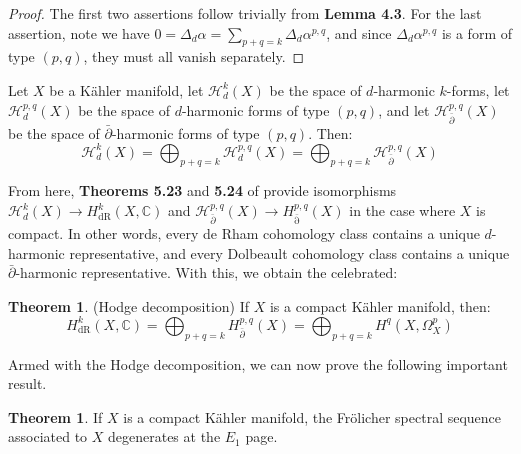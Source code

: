 \documentclass[11pt]{article}
\newcommand{\C}{\mathbb{C}}
\theoremstyle{definition}
\newtheorem{theorem}[equation]{Theorem}
\numberwithin{theorem}{section} %
\numberwithin{equation}{section} %
\begin{document}
\begin{proof}
    The first two assertions follow trivially from \textbf{Lemma 4.3}. For the last assertion, note we have $0 = \Delta_d\alpha = \sum_{p+q=k}\Delta_d\alpha^{p,q}$, and since $\Delta_d\alpha^{p,q}$ is a form of type $(p,q)$, they must all vanish separately.
\end{proof}

\begin{corollary}
    Let $X$ be a K\"ahler manifold, let $\mathcal{H}^k_d(X)$ be the space of $d$-harmonic $k$-forms, let $\mathcal{H}^{p,q}_d(X)$ be the space of $d$-harmonic forms of type $(p,q)$, and let $\mathcal{H}^{p,q}_{\bar\partial}(X)$ be the space of $\bar\partial$-harmonic forms of type $(p,q)$. Then:
    $$
    \mathcal{H}^{k}_d(X) = \bigoplus_{p+q=k}\mathcal{H}^{p,q}_{d}(X)=\bigoplus_{p+q=k}\mathcal{H}^{p,q}_{\bar\partial}(X)
    $$
\end{corollary}

\noindent From here, \textbf{Theorems 5.23} and \textbf{5.24} of \cite{VoisinI2002} provide isomorphisms $\mathcal{H}^k_d(X) \to H^k_\mathrm{dR}(X,\C)$ and $\mathcal{H}^{p,q}_{\bar\partial}(X) \to H^{p,q}_\mathrm{\bar\partial}(X)$ in the case where $X$ is compact. In other words, every de Rham cohomology class contains a unique $d$-harmonic representative, and every Dolbeault cohomology class contains a unique $\bar\partial$-harmonic representative. With this, we obtain the celebrated:
\begin{theorem}
    (Hodge decomposition) If $X$ is a compact K\"ahler manifold, then:
    $$
    H^k_\mathrm{dR}(X,\C) = \bigoplus_{p+q=k} H^{p,q}_{\bar\partial} (X) = \bigoplus_{p+q=k} H^q\left(X,\Omega_X^p\right)
    $$
\end{theorem}

\noindent Armed with the Hodge decomposition, we can now prove the following important result. 
\begin{theorem}
    If $X$ is a compact K\"ahler manifold, the Fr\"olicher spectral sequence associated to $X$ degenerates at the $E_1$ page. 
\end{theorem}
\end{document}
